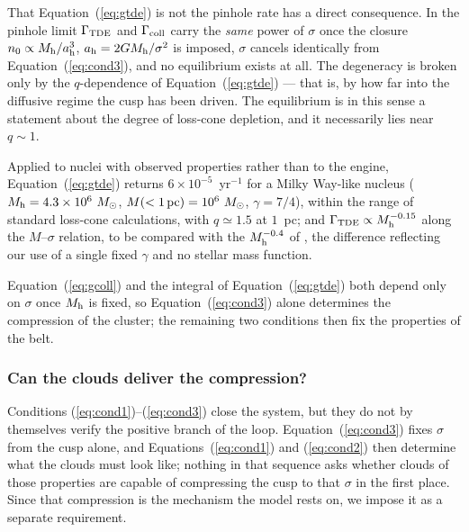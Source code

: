 \documentclass[preprint2]{aastex}
\newcommand{\msun}{M_{\odot}\xspace}
\begin{document}
That Equation~(\ref{eq:gtde}) is not the pinhole rate has a direct consequence. In the pinhole limit $\Gamma_{\rm TDE}$ and $\Gamma_{\rm coll}$ carry the {\it same} power of $\sigma$ once the closure $n_{0} \propto M_{\rm h}/a_{\rm h}^{3}$, $a_{\rm h} = 2GM_{\rm h}/\sigma^{2}$ is imposed, $\sigma$ cancels identically from Equation~(\ref{eq:cond3}), and no equilibrium exists at all. The degeneracy is broken only by the $q$-dependence of Equation~(\ref{eq:gtde}) --- that is, by how far into the diffusive regime the cusp has been driven. The equilibrium is in this sense a statement about the degree of loss-cone depletion, and it necessarily lies near $q \sim 1$.

Applied to nuclei with observed properties rather than to the engine, Equation~(\ref{eq:gtde}) returns $6 \times 10^{-5}$~yr$^{-1}$ for a Milky Way-like nucleus ($M_{\rm h} = 4.3\times10^{6}~\msun$, $M(<1\,{\rm pc}) = 10^{6}~\msun$, $\gamma = 7/4$), within the range of standard loss-cone calculations, with $q \simeq 1.5$ at $1$~pc; and $\Gamma_{\rm TDE} \propto M_{\rm h}^{-0.15}$ along the $M$--$\sigma$ relation, to be compared with the $M_{\rm h}^{-0.4}$ of \citet{Stone:2016a}, the difference reflecting our use of a single fixed $\gamma$ and no stellar mass function.

Equation~(\ref{eq:gcoll}) and the integral of Equation~(\ref{eq:gtde}) both depend only on $\sigma$ once $M_{\rm h}$ is fixed, so Equation~(\ref{eq:cond3}) alone determines the compression of the cluster; the remaining two conditions then fix the properties of the belt.

\subsubsection{Can the clouds deliver the compression?}\label{sec:compcond}

Conditions (\ref{eq:cond1})--(\ref{eq:cond3}) close the system, but they do not by themselves verify the positive branch of the loop. Equation~(\ref{eq:cond3}) fixes $\sigma$ from the cusp alone, and Equations~(\ref{eq:cond1}) and (\ref{eq:cond2}) then determine what the clouds must look like; nothing in that sequence asks whether clouds of those properties are capable of compressing the cusp to that $\sigma$ in the first place. Since that compression is the mechanism the model rests on, we impose it as a separate requirement.
\end{document}

